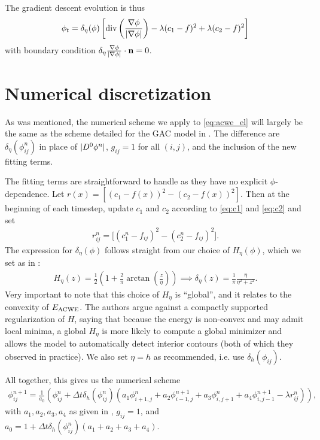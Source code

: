 The gradient descent evolution is thus 
\begin{align}
\phi_t 
= \delta_\eta(\phi) \left[ 
\operatorname{div}\left(\frac{\nabla \phi}{\lvert\nabla \phi\rvert} \right) - \lambda (c_1 - f)^2 + \lambda (c_2 - f)^2 
\right]
\label{eq:acwe_el}
\end{align}
with boundary condition $\delta_\eta 
\frac{\nabla \phi}{\lvert\nabla \phi\rvert} \cdot \mathbf{n} = 0$.


\section{Numerical discretization}
\label{sec:3.2}
As was mentioned, the numerical scheme we apply to \eqref{eq:acwe_el} will largely be the same as the scheme detailed for the GAC model in . The difference are $\delta_\eta(\phi^n_{ij})$ in place of $\lvert D^0 \phi^n\rvert$, $g_{ij} = 1$ for all $(i,j)$, and the inclusion of the new fitting terms.

The fitting terms are straightforward to handle as they have no explicit $\phi$-dependence. Let $r(x) = [(c_1 - f(x))^2 - (c_2 - f(x))^2 ]$. Then at the beginning of each timestep, update $c_1$ and $c_2$ according to \eqref{eq:c1} and \eqref{eq:c2} and set
\begin{align*}
r_{ij}^n = \big[ (c_1^n - f_{ij})^2 - (c_2^n - f_{ij})^2 \big].
\end{align*}
The expression for $\delta_\eta(\phi)$ follows straight from our choice of $H_\eta(\phi)$, which we set as in \cite{chan2001active}:
\begin{align*}
H_\eta(z)
 = \frac{1}{2} 
\left(1 + \frac{2}{\pi}\arctan
\left(\frac{z}{\eta} 
\right) \right)
\implies 
\delta_\eta(z)  
=  \frac{1}{\pi}\frac{\eta}{\eta^2  + z^2}.
\end{align*}
Very important to note that this choice of $H_\eta$ is ``global'', and it relates to the convexity of $E_\textrm{ACWE}$. The authors argue against a compactly supported regularization of $H$, saying that because the energy is non-convex and may admit local minima, a global $H_\eta$ is more likely to compute a global minimizer and allows the model to automatically detect interior contours (both of which they observed in practice). We also set $\eta = h$ as recommended, i.e. use $\delta_h(\phi_{ij})$.

All together, this gives us the numerical scheme
\begin{align*}
\phi^{n+1}_{ij} 
= \frac{1}{a_0} 
\left( \phi^n_{ij} + \Delta t \delta_h(\phi_{ij}^n)
\left( a_1 \phi^n_{i+1,j} + a_2 \phi^{n+1}_{i-1,j} + a_3 \phi^{n}_{i,j+1} + a_4 \phi^{n+1}_{i,j-1} 
- \lambda r_{ij}^n
\right)
\right),
\end{align*}
with $a_1, a_2, a_3, a_4$  as given in , $g_{ij} = 1$, and $a_0 = 1 + \Delta t \delta_h(\phi_{ij}^n)(a_1 + a_2 + a_3 + a_4)$.

